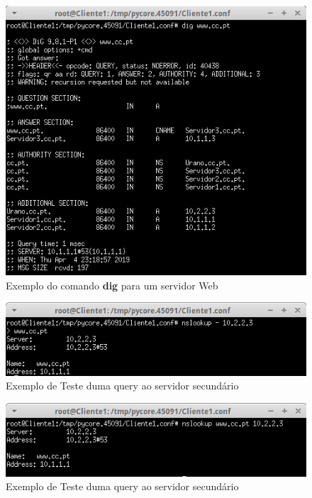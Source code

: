 \documentclass{llncs}
\begin{document}
\begin{figure}[H]
\begin{center}
\includegraphics[scale=0.75]{teste4.png}
\end{center}
\caption{\label{fig:t4}Exemplo do comando \textbf{dig} para um servidor Web }
\end{figure}

\begin{figure}[H]
\begin{center}
\includegraphics[scale=0.75]{teste5.png}
\end{center}
\caption{\label{fig:t5}Exemplo de Teste duma query ao servidor secundário}
\end{figure}

\begin{figure}[H]
\begin{center}
\includegraphics[scale=0.75]{teste6.png}
\end{center}
\caption{\label{fig:t6}Exemplo de Teste duma query ao servidor secundário}
\end{figure}
\end{document}
